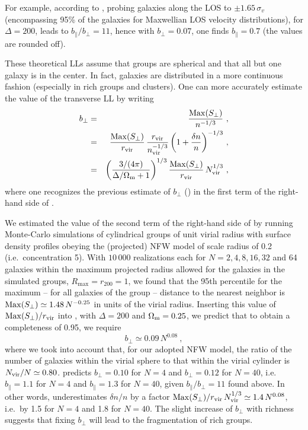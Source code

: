 For example, according to , probing galaxies
along the LOS to $\pm1.65\,\sigma_v$ (encompassing 95\% of the galaxies for
Maxwellian LOS velocity distributions), for $\Delta = 200$, leads to
$b_\parallel/b_\perp=11$, hence with $b_\perp=0.07$, one finds
$b_\parallel=0.7$ (the values are rounded off).

These theoretical LLs assume that groups are spherical and that all but one
galaxy is in the center. In fact,  galaxies are distributed in a more
continuous fashion (especially in rich groups and clusters).
%
One can more accurately estimate the value of the transverse LL by writing
%
\begin{eqnarray}
    b_\perp &=& {{\rm Max}(S_\perp)\over  n^{-1/3}}
    \ ,
      \nonumber \\
    &=& {{\rm Max}(S_\perp)\over r_{{\rm vir}}}\,
    {r_{{\rm vir}}\over  n_{\rm vir}^{-1/3}}\,
    {\left(1+{\delta n\over n}\right)}^{-1/3}
     \ , \nonumber \\
    &=& {\left({3/(4\pi)\over \Delta/\Omega_{\rm m}+1}\right)}^{1/3}\,
    {{\rm Max}(S_\perp)\over
        r_{{\rm vir}}}\,N_{\rm vir}^{1/3} \ ,
    \label{eq:bperppred2}
\end{eqnarray}
%
where one recognizes the previous estimate of $b_\perp$
() in the first term of the right-hand side of
.

We estimated the value of the second term of the right-hand side of
 by running Monte-Carlo simulations of cylindrical
groups of unit virial radius with surface density profiles obeying the
(projected) NFW model of scale radius of 0.2 (i.e.\ concentration 5). With
$10\,000$ realizations each for $N=2, 4, 8, 16, 32$ and 64 galaxies within  the
maximum projected radius allowed for the galaxies in the simulated groups,
$R_{\max}=r_{200} =1$, we found that the  95th percentile for the maximum {--}
for all galaxies of the group {--} distance to the nearest neighbor is ${\rm
Max}(S_\perp) \simeq 1.48\,N^{-0.25}$ in units of the virial radius.
%
Inserting this value of ${\rm Max}(S_\perp)/r_{{\rm vir}}$ into
, with $\Delta=200$ and $\Omega_{\rm m}=0.25$, we
predict that to obtain a completeness of 0.95, we require
%
\begin{equation}
    b_\perp \simeq 0.09\,N^{0.08} \ ,
    \label{eq:bperppred3}
\end{equation}
%
where we took into account that, for our adopted NFW model, the ratio of the
number of galaxies within the virial sphere to that within the virial cylinder
is $N_{\rm vir}/N\simeq 0.80$.  predicts
$b_\perp=0.10$ for $N=4$ and $b_\perp=0.12$ for $N=40$, i.e. $b_\parallel=1.1$
for $N=4$ and $b_\parallel=1.3$ for $N=40$, given $b_\parallel/b_\perp=11$
found above. In other words,  underestimates
$\delta n/n$ by a factor ${\rm Max}(S_\perp)/r_{{\rm vir}}\,N_{\rm vir}^{1/3}
\simeq 1.4\,N^{0.08}$, i.e.\ by 1.5 for $N=4$ and 1.8 for $N=40$. The slight
increase of $b_\perp$ with richness suggests that fixing $b_\perp$ will lead to
the fragmentation of rich groups.

